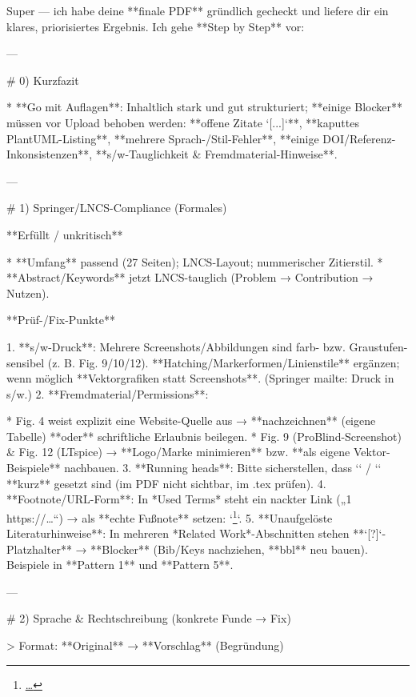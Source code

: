 Super — ich habe deine **finale PDF** gründlich gecheckt und liefere dir ein klares, priorisiertes Ergebnis. Ich gehe **Step by Step** vor:

---

# 0) Kurzfazit

* **Go mit Auflagen**: Inhaltlich stark und gut strukturiert; **einige Blocker** müssen vor Upload behoben werden: **offene Zitate `[...]`**, **kaputtes PlantUML-Listing**, **mehrere Sprach-/Stil-Fehler**, **einige DOI/Referenz-Inkonsistenzen**, **s/w-Tauglichkeit & Fremdmaterial-Hinweise**. 

---

# 1) Springer/LNCS-Compliance (Formales)

**Erfüllt / unkritisch**

* **Umfang** passend (27 Seiten); LNCS-Layout; nummerischer Zitierstil. 
* **Abstract/Keywords** jetzt LNCS-tauglich (Problem → Contribution → Nutzen). 

**Prüf-/Fix-Punkte**

1. **s/w-Druck**: Mehrere Screenshots/Abbildungen sind farb- bzw. Graustufen-sensibel (z. B. Fig. 9/10/12). **Hatching/Markerformen/Linienstile** ergänzen; wenn möglich **Vektorgrafiken statt Screenshots**. (Springer mailte: Druck in s/w.) 
2. **Fremdmaterial/Permissions**:

   * Fig. 4 weist explizit eine Website-Quelle aus → **nachzeichnen** (eigene Tabelle) **oder** schriftliche Erlaubnis beilegen. 
   * Fig. 9 (ProBlind-Screenshot) & Fig. 12 (LTspice) → **Logo/Marke minimieren** bzw. **als eigene Vektor-Beispiele** nachbauen. 
3. **Running heads**: Bitte sicherstellen, dass `` / `` **kurz** gesetzt sind (im PDF nicht sichtbar, im .tex prüfen).
4. **Footnote/URL-Form**: In *Used Terms* steht ein nackter Link („1 https://…“) → als **echte Fußnote** setzen: `\footnote{\url{…}}`. 
5. **Unaufgelöste Literaturhinweise**: In mehreren *Related Work*-Abschnitten stehen **`[?]`-Platzhalter** → **Blocker** (Bib/Keys nachziehen, **bbl** neu bauen). Beispiele in **Pattern 1** und **Pattern 5**. 

---

# 2) Sprache & Rechtschreibung (konkrete Funde → Fix)

> Format: **Original** → **Vorschlag** (Begründung)


